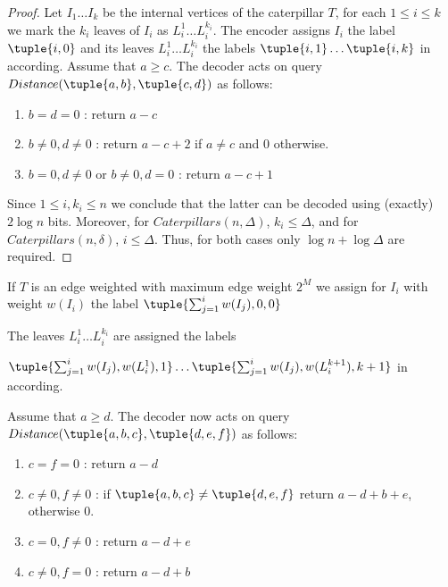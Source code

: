 	 \begin{proof}
	 Let $I_1 \dots I_k$ be the internal vertices of the caterpillar $T$, for each  $1 \leq i \leq k$ we mark the $k_i$ leaves of $I_i$ as $L_i^1 \dots L_i^{k_i}$.
	 The encoder assigns $I_i$ the label $\tuple{i,0}$ and its leaves $L_i^1 \dots L_i^{k_i}$ the labels $\tuple{i,1} \dots \tuple{i,k}$ in according.
	 Assume that $a \geq c$.
	 The decoder acts on query $Distance(\tuple{a,b},\tuple{c,d})$ as follows:
	 	\begin{enumerate}
		\item $b=d=0$ : return $a-c$
		\item $ b\neq 0 ,d \neq 0$ : return $a-c+2$ if $ a \neq c$ and $0$ otherwise.
		\item $ b = 0 ,d \neq 0$ or  $ b  \neq 0,d = 0$  : return $a-c+1$
	 	\end{enumerate}
		Since $1 \leq i,k_i \leq n$ we conclude that the latter can be decoded using (exactly) $ 2 \log n$ bits.
		Moreover, for $Caterpillars(n,\Delta)$, $k_i \leq \Delta$, and for $Caterpillars(n,\delta)$, $i \leq \Delta$.
		Thus, for both cases  only $  \log n + \log \Delta $  are required.
 	 \end{proof}
	 
	 If $T$ is an edge  weighted with maximum edge weight $2^M$ we assign  for $I_i$ with weight $w(I_i)$ the label $\tuple{\sum_{j=1}^{i} w(I_j) ,0,0}$ 
	 
	 The leaves $L_i^1 \dots L_i^{k_i}$ are assigned the labels
	 
	  $\tuple{\sum_{j=1}^{i} w(I_j) , w(L_i^1)  ,1} \dots \tuple{\sum_{j=1}^{i} w(I_j) , w(L_i^{k+1})  ,k+1} $ in according.
	  
	   Assume that $a \geq d$.
	 The decoder now  acts on query $Distance(\tuple{a,b,c},\tuple{d,e,f})$ as follows:
	 	\begin{enumerate}
		\item $c=f=0$ : return $a-d$
		\item $ c\neq 0 ,f \neq 0$ : if $\tuple{a,b,c} \neq \tuple{d,e,f}$  return $a-d+b+e$, otherwise  $0$.
		\item $ c = 0 ,f  \neq 0$ : return $a-d+e$
		\item $ c \neq  0 ,f  = 0$ : return $a-d+b$
	 	\end{enumerate}
		
